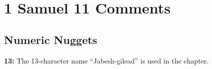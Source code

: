 \section{1 Samuel 11 Comments}

\subsection{Numeric Nuggets}
\textbf{13: } The 13-character name ``Jabesh-gilead'' is used in the chapter.
